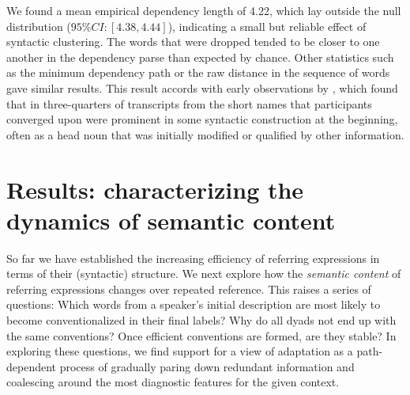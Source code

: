 \documentclass[alpha-refs]{wiley-article}
\begin{document}
We found a mean empirical dependency length of 4.22, which lay outside the null distribution ($95\% CI: [4.38, 4.44]$), indicating a small but reliable effect of syntactic clustering.
The words that were dropped tended to be closer to one another in the dependency parse than expected by chance.
Other statistics such as the minimum dependency path or the raw distance in the sequence of words gave similar results.
This result accords with early observations by \cite{Carroll80_NamingHedges}, which found that in three-quarters of transcripts from \cite{KraussWeinheimer64_ReferencePhrases} the short names that participants converged upon were prominent in some syntactic construction at the beginning, often as a head noun that was initially modified or qualified by other information. 

\section{Results: characterizing the dynamics of semantic content}
\label{sec:content} 

So far we have established the increasing efficiency of referring expressions in terms of their (syntactic) structure. 
We next explore how the \emph{semantic content} of referring expressions changes over repeated reference.
This raises a series of questions:
Which words from a speaker's initial description are most likely to become conventionalized in their final labels?
Why do all dyads not end up with the same conventions?
Once efficient conventions are formed, are they stable?
In exploring these questions, we find support for a view of adaptation as a path-dependent process of gradually paring down redundant information and coalescing around the most diagnostic features for the given context.
\end{document}

